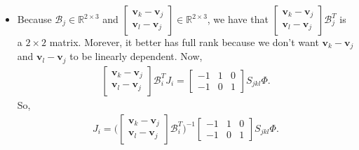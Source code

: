 \documentclass[10pt]{article}
\newcommand{\ve}[1]{\mathbf{#1}}
\newcommand{\mcal}[1]{\mathcal{#1}}
\newcommand{\Real}{\mathbb{R}}
\begin{document}
\begin{itemize}
\begin{itemize}
\begin{itemize}
            \item Because $\mcal{B}_j \in \Real^{2 \times 3}$ and $\begin{bmatrix} \ve{v}_k-\ve{v}_j \\ \ve{v}_l-\ve{v}_j \end{bmatrix} \in \Real^{2\times 3}$, we have that $\begin{bmatrix} \ve{v}_k-\ve{v}_j \\ \ve{v}_l-\ve{v}_j \end{bmatrix} \mcal{B}_j^T$ is a $2 \times 2$ matrix. Morever, it better has full rank because we don't want $\ve{v}_k - \ve{v}_j$ and $\ve{v}_l - \ve{v}_j$ to be linearly dependent. Now,
            \begin{align*}
                \begin{bmatrix}
                    \ve{v}_k - \ve{v}_j \\ 
                    \ve{v}_l - \ve{v}_j
                \end{bmatrix}
                \mcal{B}_i^T
                J_i
                = \begin{bmatrix} -1 & 1 & 0 \\ -1 & 0 & 1 \end{bmatrix}  S_{jkl} \Phi.
            \end{align*}
            So,
            \begin{align*}
                J_i = \bigg( \begin{bmatrix}
                    \ve{v}_k - \ve{v}_j \\ 
                    \ve{v}_l - \ve{v}_j
                \end{bmatrix}
                \mcal{B}_i^T \bigg)^{-1} \begin{bmatrix} -1 & 1 & 0 \\ -1 & 0 & 1 \end{bmatrix}  S_{jkl} \Phi.
            \end{align*}
            

\end{itemize}
\end{itemize}
\end{itemize}
\end{document}

